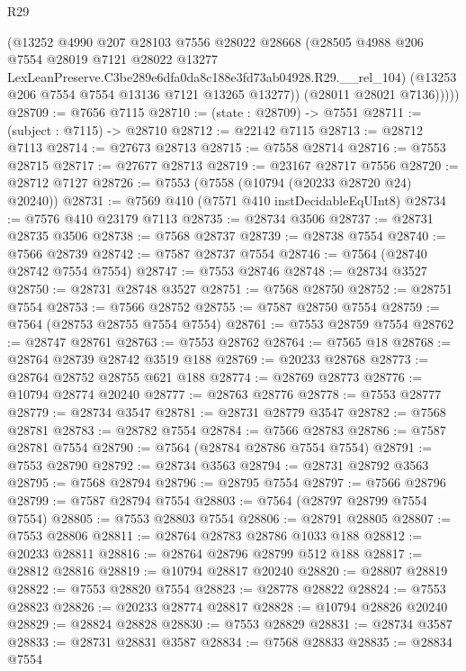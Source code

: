 \begin{lexlean}{R29}
\begin{coremodule}
            (@13252
              @4990
              @207
              @28103
              @7556
              @28022
              @28668
              (@28505
                @4988
                @206
                @7554
                @28019
                @7121
                @28022
                @13277
                LexLeanPreserve.C3be289e6dfa0da8c188e3fd73ab04928.R29.__rel_104)
              (@13253 @206 @7554 @7554 @13136 @7121 @13265 @13277))
            (@28011 @28021 @7136)))))
@28709 := @7656 @7115
@28710 := (state : @28709) -> @7551
@28711 := (subject : @7115) -> @28710
@28712 := @22142 @7115
@28713 := @28712 @7113
@28714 := @27673 @28713
@28715 := @7558 @28714
@28716 := @7553 @28715
@28717 := @27677 @28713
@28719 := @23167 @28717 @7556
@28720 := @28712 @7127
@28726 := @7553 (@7558 (@10794 (@20233 @28720 @24) @20240))
@28731 := @7569 @410 (@7571 @410 instDecidableEqUInt8)
@28734 := @7576 @410 @23179 @7113
@28735 := @28734 @3506
@28737 := @28731 @28735 @3506
@28738 := @7568 @28737
@28739 := @28738 @7554
@28740 := @7566 @28739
@28742 := @7587 @28737 @7554
@28746 := @7564 (@28740 @28742 @7554 @7554)
@28747 := @7553 @28746
@28748 := @28734 @3527
@28750 := @28731 @28748 @3527
@28751 := @7568 @28750
@28752 := @28751 @7554
@28753 := @7566 @28752
@28755 := @7587 @28750 @7554
@28759 := @7564 (@28753 @28755 @7554 @7554)
@28761 := @7553 @28759 @7554
@28762 := @28747 @28761
@28763 := @7553 @28762
@28764 := @7565 @18
@28768 := @28764 @28739 @28742 @3519 @188
@28769 := @20233 @28768
@28773 := @28764 @28752 @28755 @621 @188
@28774 := @28769 @28773
@28776 := @10794 @28774 @20240
@28777 := @28763 @28776
@28778 := @7553 @28777
@28779 := @28734 @3547
@28781 := @28731 @28779 @3547
@28782 := @7568 @28781
@28783 := @28782 @7554
@28784 := @7566 @28783
@28786 := @7587 @28781 @7554
@28790 := @7564 (@28784 @28786 @7554 @7554)
@28791 := @7553 @28790
@28792 := @28734 @3563
@28794 := @28731 @28792 @3563
@28795 := @7568 @28794
@28796 := @28795 @7554
@28797 := @7566 @28796
@28799 := @7587 @28794 @7554
@28803 := @7564 (@28797 @28799 @7554 @7554)
@28805 := @7553 @28803 @7554
@28806 := @28791 @28805
@28807 := @7553 @28806
@28811 := @28764 @28783 @28786 @1033 @188
@28812 := @20233 @28811
@28816 := @28764 @28796 @28799 @512 @188
@28817 := @28812 @28816
@28819 := @10794 @28817 @20240
@28820 := @28807 @28819
@28822 := @7553 @28820 @7554
@28823 := @28778 @28822
@28824 := @7553 @28823
@28826 := @20233 @28774 @28817
@28828 := @10794 @28826 @20240
@28829 := @28824 @28828
@28830 := @7553 @28829
@28831 := @28734 @3587
@28833 := @28731 @28831 @3587
@28834 := @7568 @28833
@28835 := @28834 @7554

\end{coremodule}
\end{lexlean}
